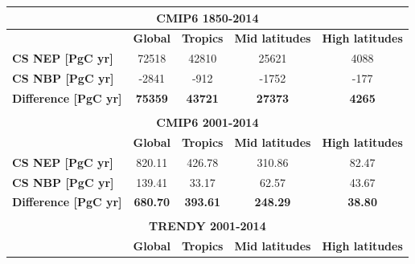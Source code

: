 \documentclass[9pt,twoside]{pnas-new}
\begin{document}
\begin{table}[H]
\label{Table:CSdiff_NEP_NBP}
\centering
\begin{tabular}{lcccc}
\hline
\multicolumn{5}{c}{\textbf{CMIP6 1850-2014}}                                                                                       \\ \hline
\textbf{}                         & \textbf{Global}      & \textbf{Tropics}     & \textbf{Mid latitudes} & \textbf{High latitudes} \\
\textbf{CS NEP {[}PgC yr{]}}      & 72518              & 42810              & 25621                & 4088                 \\
\textbf{CS NBP {[}PgC yr{]}}      & -2841             & -912             & -1752               & -177               \\ \hline
\textbf{Difference  {[}PgC yr{]}} & \textbf{75359}     & \textbf{43721}     & \textbf{27373}       & \textbf{4265}        \\ \hline
                                  & \multicolumn{1}{l}{} & \multicolumn{1}{l}{} & \multicolumn{1}{l}{}   & \multicolumn{1}{l}{}    \\ \hline
\multicolumn{5}{c}{\textbf{CMIP6 2001-2014}}                                                                                       \\ \hline
\textbf{}                         & \textbf{Global}      & \textbf{Tropics}     & \textbf{Mid latitudes} & \textbf{High latitudes} \\
\textbf{CS NEP {[}PgC yr{]}}      & 820.11               & 426.78               & 310.86                 & 82.47                   \\
\textbf{CS NBP {[}PgC yr{]}}      & 139.41               & 33.17                & 62.57                  & 43.67                   \\
\textbf{Difference  {[}PgC yr{]}} & \textbf{680.70}      & \textbf{393.61}      & \textbf{248.29}        & \textbf{38.80}          \\ \hline
                                  & \multicolumn{1}{l}{} & \multicolumn{1}{l}{} & \multicolumn{1}{l}{}   & \multicolumn{1}{l}{}    \\ \hline
\multicolumn{5}{c}{\textbf{TRENDY 2001-2014}}                                                                                      \\ \hline
\textbf{}                         & \textbf{Global}      & \textbf{Tropics}     & \textbf{Mid latitudes} & \textbf{High latitudes} \\

\end{tabular}
\end{table}
\end{document}
